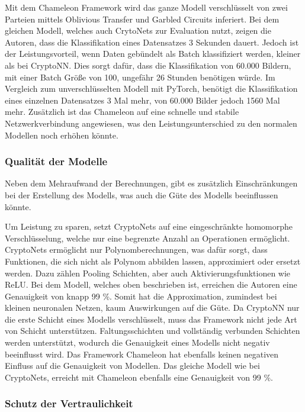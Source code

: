 Mit dem Chameleon Framework \cite{P-72} wird das ganze Modell verschlüsselt von zwei Parteien mittels Oblivious Transfer und Garbled Circuits inferiert.
Bei dem gleichen Modell, welches auch CrytoNets zur Evaluation nutzt, zeigen die Autoren, dass die Klassifikation eines Datensatzes 3 Sekunden dauert.
Jedoch ist der Leistungsvorteil, wenn Daten gebündelt als Batch klassifiziert werden, kleiner als bei CryptoNN.
Dies sorgt dafür, dass die Klassifikation von 60.000 Bildern, mit einer Batch Größe von 100, ungefähr 26 Stunden benötigen würde.
Im Vergleich zum unverschlüsselten Modell mit PyTorch, benötigt die Klassifikation eines einzelnen Datensatzes 3 Mal mehr, von 60.000 Bilder jedoch 1560 Mal mehr.
Zusätzlich ist das Chameleon auf eine schnelle und stabile Netzwerkverbindung angewiesen, was den Leistungsunterschied zu den normalen Modellen noch erhöhen könnte.

\subsubsection*{Qualität der Modelle}

Neben dem Mehraufwand der Berechnungen, gibt es zusätzlich Einschränkungen bei der Erstellung des Modells, was auch die Güte des Modells beeinflussen könnte.

Um Leistung zu sparen, setzt CryptoNets \cite{P-54} auf eine eingeschränkte homomorphe Verschlüsselung, welche nur eine begrenzte Anzahl an Operationen ermöglicht.
CryptoNets ermöglicht nur Polynomberechnungen, was dafür sorgt, dass Funktionen, die sich nicht als Polynom abbilden lassen, approximiert oder ersetzt werden.
Dazu zählen Pooling Schichten, aber auch Aktivierungsfunktionen wie ReLU.
Bei dem Modell, welches oben beschrieben ist, erreichen die Autoren eine Genauigkeit von knapp 99 \%.
Somit hat die Approximation, zumindest bei kleinen neuronalen Netzen, kaum Auswirkungen auf die Güte.
Da CryptoNN \cite{P-53} nur die erste Schicht eines Modells verschlüsselt, muss das Framework nicht jede Art von Schicht unterstützen.
Faltungsschichten und vollständig verbunden Schichten werden unterstützt, wodurch die Genauigkeit eines Modells nicht negativ beeinflusst wird.
Das Framework Chameleon \cite{P-72} hat ebenfalls keinen negativen Einfluss auf die Genauigkeit von Modellen.
Das gleiche Modell wie bei CryptoNets, erreicht mit Chameleon ebenfalls eine Genauigkeit von 99 \%.

\subsubsection*{Schutz der Vertraulichkeit}

